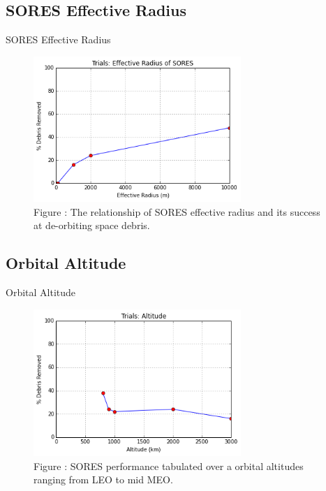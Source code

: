 \documentclass{beamer}
\begin{document}
\subsection{SORES Effective Radius}

\begin{frame}{SORES Effective Radius}
\begin{figure}
\begin{center}
\label{fig:resultsvseffectiveradius}
\includegraphics[width=0.7\textwidth]{radius.png}\\
Figure : The relationship of SORES effective radius and its success at de-orbiting space debris.
\end{center}
\end{figure}
\end{frame}


\subsection{Orbital Altitude}

\begin{frame}{Orbital Altitude}
\begin{figure}
\begin{center}
\label{fig:altitudesensitivity}
\includegraphics[width=0.7\textwidth]{altitude.png}\\
Figure : SORES performance tabulated over a orbital altitudes ranging from LEO to mid MEO.
\end{center}
\end{figure}
\end{frame}
\end{document}
